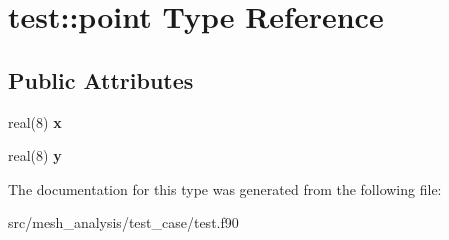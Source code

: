\hypertarget{structtest_1_1point}{}\section{test\+:\+:point Type Reference}
\label{structtest_1_1point}
\subsection*{Public Attributes}
\begin{DoxyCompactItemize}
\item 
\mbox{\label{structtest_1_1point_ae212d7a1eed7165d99800d948e033a3b}} 
real(8) {\bfseries x}
\item 
\mbox{\label{structtest_1_1point_a4b561b0e1dad471d3c556710045fbde7}} 
real(8) {\bfseries y}
\end{DoxyCompactItemize}


The documentation for this type was generated from the following file\+:\begin{DoxyCompactItemize}
\item 
src/mesh\+\_\+analysis/test\+\_\+case/test.\+f90\end{DoxyCompactItemize}
